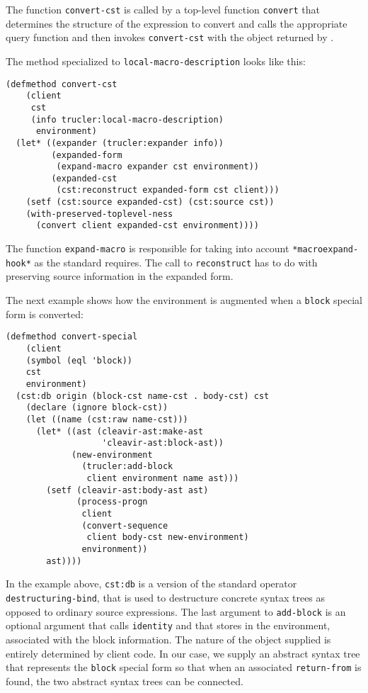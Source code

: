 The function \texttt{convert-cst} is called by a top-level function
\texttt{convert} that determines the structure of the expression to
convert and calls the appropriate \trucler{} query function and then
invokes \texttt{convert-cst} with the object returned by \trucler{}.

The method specialized to \texttt{local-macro-description} looks like
this:

{\small
\begin{verbatim}
(defmethod convert-cst
    (client
     cst
     (info trucler:local-macro-description)
      environment)
  (let* ((expander (trucler:expander info))
         (expanded-form
          (expand-macro expander cst environment))
         (expanded-cst
          (cst:reconstruct expanded-form cst client)))
    (setf (cst:source expanded-cst) (cst:source cst))
    (with-preserved-toplevel-ness
      (convert client expanded-cst environment))))
\end{verbatim}
}

\noindent
The function \texttt{expand-macro} is responsible for taking into
account \texttt{*macroexpand-hook*} as the \commonlisp{} standard
requires.  The call to \texttt{reconstruct} has to do with preserving
source information in the expanded form.

The next example shows how the environment is augmented when a
\texttt{block} special form is converted:

{\small
\begin{verbatim}
(defmethod convert-special
    (client
    (symbol (eql 'block))
    cst
    environment)
  (cst:db origin (block-cst name-cst . body-cst) cst
    (declare (ignore block-cst))
    (let ((name (cst:raw name-cst)))
      (let* ((ast (cleavir-ast:make-ast
                   'cleavir-ast:block-ast))
             (new-environment
               (trucler:add-block
                client environment name ast)))
        (setf (cleavir-ast:body-ast ast)
              (process-progn
               client
               (convert-sequence
                client body-cst new-environment)
               environment))
        ast))))
\end{verbatim}
}

\noindent
In the example above, \texttt{cst:db} is a version of the standard
\commonlisp{} operator \texttt{destructuring-bind}, that is used to
destructure concrete syntax trees as opposed to ordinary \commonlisp{}
source expressions.  The last argument to \texttt{add-block} is an
optional argument that \trucler{} calls \texttt{identity} and that
\trucler{} stores in the environment, associated with the block
information.  The nature of the object supplied is entirely determined
by client code.  In our case, we supply an abstract syntax tree that
represents the \texttt{block} special form so that when an associated
\texttt{return-from} is found, the two abstract syntax trees can be
connected.
